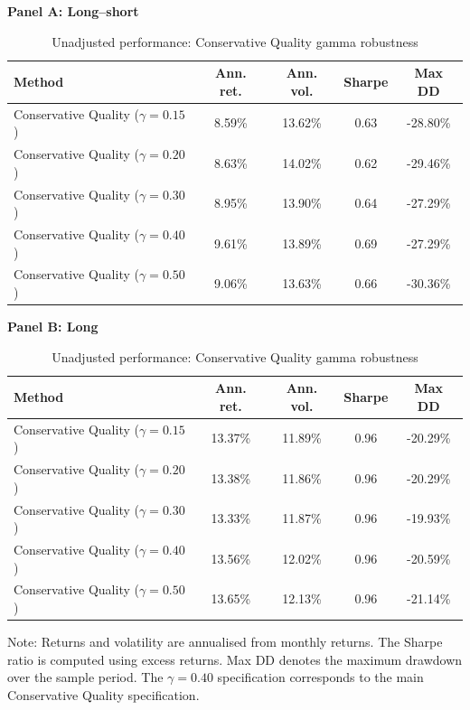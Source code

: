 \begin{table}[H]
\centering
\footnotesize
\renewcommand{\arraystretch}{1.12}
\setlength{\tabcolsep}{4pt}
\caption[Unadjusted performance: Conservative Quality gamma robustness]{Unadjusted performance: Conservative Quality gamma robustness}
\label{tab:conservative_gamma_raw_performance}
\begin{threeparttable}
{\centering\textbf{Panel A: Long--short}\par}
\vspace{0.4em}
\begin{tabular*}{\textwidth}{@{\extracolsep{\fill}}lcccc}
\toprule
Method & Ann. ret. & Ann. vol. & Sharpe & Max DD \\
\midrule
Conservative Quality ($\gamma=0.15$) & 8.59\% & 13.62\% & 0.63 & -28.80\% \\
Conservative Quality ($\gamma=0.20$) & 8.63\% & 14.02\% & 0.62 & -29.46\% \\
Conservative Quality ($\gamma=0.30$) & 8.95\% & 13.90\% & 0.64 & -27.29\% \\
Conservative Quality ($\gamma=0.40$) & 9.61\% & 13.89\% & 0.69 & -27.29\% \\
Conservative Quality ($\gamma=0.50$) & 9.06\% & 13.63\% & 0.66 & -30.36\% \\
\bottomrule
\end{tabular*}
\vspace{1em}
{\centering\textbf{Panel B: Long}\par}
\vspace{0.4em}
\begin{tabular*}{\textwidth}{@{\extracolsep{\fill}}lcccc}
\toprule
Method & Ann. ret. & Ann. vol. & Sharpe & Max DD \\
\midrule
Conservative Quality ($\gamma=0.15$) & 13.37\% & 11.89\% & 0.96 & -20.29\% \\
Conservative Quality ($\gamma=0.20$) & 13.38\% & 11.86\% & 0.96 & -20.29\% \\
Conservative Quality ($\gamma=0.30$) & 13.33\% & 11.87\% & 0.96 & -19.93\% \\
Conservative Quality ($\gamma=0.40$) & 13.56\% & 12.02\% & 0.96 & -20.59\% \\
Conservative Quality ($\gamma=0.50$) & 13.65\% & 12.13\% & 0.96 & -21.14\% \\
\bottomrule
\end{tabular*}
\begin{tablenotes}[flushleft]
\scriptsize
\item Note: Returns and volatility are annualised from monthly returns. The Sharpe ratio is computed using excess returns. Max DD denotes the maximum drawdown over the sample period. The $\gamma=0.40$ specification corresponds to the main Conservative Quality specification.
\end{tablenotes}
\end{threeparttable}
\end{table}
